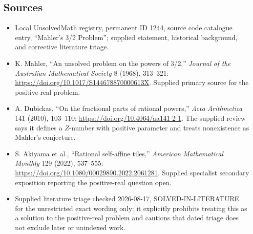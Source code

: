 \documentclass[11pt]{article}
\begin{document}
\subsection{Sources}
\begin{itemize}
\item Local UnsolvedMath registry, permanent ID 1244, source code catalogue entry, ``Mahler's 3/2 Problem''; supplied statement, historical background, and corrective literature triage.
\item K. Mahler, ``An unsolved problem on the powers of 3/2,'' \emph{Journal of the Australian Mathematical Society} 8 (1968), 313--321: \url{https://doi.org/10.1017/S144678870000613X}. Supplied primary source for the positive-real problem.
\item A. Dubickas, ``On the fractional parts of rational powers,'' \emph{Acta Arithmetica} 141 (2010), 103--110: \url{https://doi.org/10.4064/aa141-2-1}. The supplied review says it defines a $Z$-number with positive parameter and treats nonexistence as Mahler's conjecture.
\item S. Akiyama et al., ``Rational self-affine tiles,'' \emph{American Mathematical Monthly} 129 (2022), 537--555: \url{https://doi.org/10.1080/00029890.2022.2061281}. Supplied specialist secondary exposition reporting the positive-real question open.
\item Supplied literature triage checked 2026-08-17, SOLVED-IN-LITERATURE for the unrestricted exact wording only; it explicitly prohibits treating this as a solution to the positive-real problem and cautions that dated triage does not exclude later or unindexed work.
\end{itemize}
\end{document}
